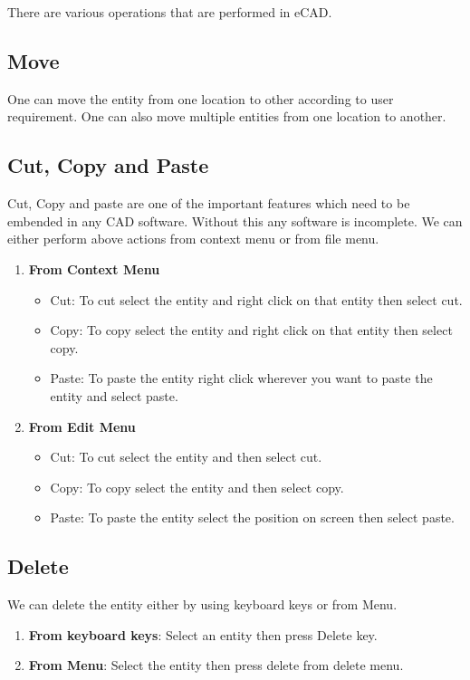 There are various operations that are performed in eCAD.
\subsection{Move}
One can move the entity from one location to other according to user requirement. One can also move multiple entities from one location to another. 
\subsection{Cut, Copy and Paste}
Cut, Copy and paste are one of the important features which need to be embended in any CAD software. Without this any software is incomplete. We can either perform above actions from context menu or from file menu.
\begin{enumerate}
\item \textbf{From Context Menu}
\begin{itemize}
\item Cut: To cut select the entity and right click on that entity then select cut. 
\item Copy: To copy select the entity and right click on that entity then select copy.
\item Paste: To paste the entity right click wherever you want to paste the entity and select paste. 
\end{itemize}
\item \textbf{From Edit Menu}
\begin{itemize}
\item Cut: To cut select the entity and  then select cut. 
\item Copy: To copy select the entity and  then select copy.
\item Paste: To paste the entity select the position on screen then select paste.
\end{itemize}
\end{enumerate}
\subsection{Delete}
We can delete the entity either by using keyboard keys or from Menu.
\begin{enumerate}
\item \textbf{From keyboard keys}:
Select an entity then press Delete key.
\item \textbf{From Menu}:
Select the entity then press delete from delete menu.
\end{enumerate}
